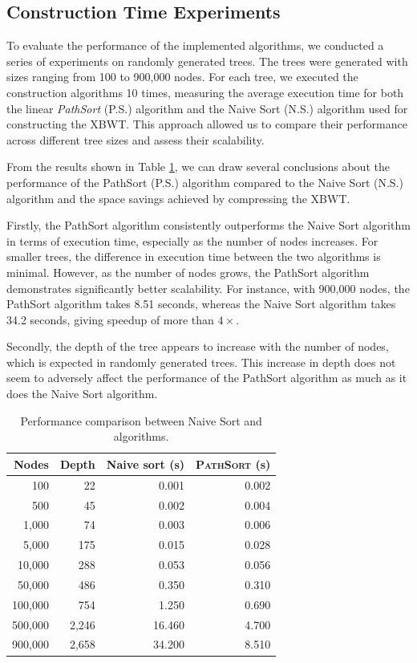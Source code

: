 \subsection{Construction Time Experiments} 

To evaluate the performance of the implemented algorithms, we conducted a series of experiments on randomly generated trees. The trees were generated with sizes ranging from 100 to 900,000 nodes. For each tree, we executed the construction algorithms 10 times, measuring the average execution time for both the linear \emph{PathSort} (P.S.) algorithm and the Naive Sort (N.S.) algorithm used for constructing the XBWT.
This approach allowed us to compare their performance across different tree sizes and assess their scalability.

From the results shown in Table \cref{tab:experiments}, we can draw several conclusions about the performance of the PathSort (P.S.) algorithm compared to the Naive Sort (N.S.) algorithm and the space savings achieved by compressing the XBWT.

Firstly, the PathSort algorithm consistently outperforms the Naive Sort algorithm in terms of execution time, especially as the number of nodes increases. For smaller trees, the difference in execution time between the two algorithms is minimal. However, as the number of nodes grows, the PathSort algorithm demonstrates significantly better scalability. For instance, with 900,000 nodes, the PathSort algorithm takes 8.51 seconds, whereas the Naive Sort algorithm takes 34.2 seconds, giving speedup of more than $4\times$.

Secondly, the depth of the tree appears to increase with the number of nodes, which is expected in randomly generated trees. This increase in depth does not seem to adversely affect the performance of the PathSort algorithm as much as it does the Naive Sort algorithm.

\begin{table}[h]
    \centering
    \begin{tabular}{|r|r||r|r|}
        \hline
        \textbf{Nodes} & \textbf{Depth} & \textbf{Naive sort} (s) & \textbf{\textsc{PathSort} (s)} \\
        \hline
            100 &    22 &  0.001 & 0.002 \\
            500 &    45 &  0.002 & 0.004 \\
          1,000 &    74 &  0.003 & 0.006 \\
          5,000 &   175 &  0.015 & 0.028 \\
         10,000 &   288 &  0.053 & 0.056 \\
         50,000 &   486 &  0.350 & 0.310 \\
        100,000 &   754 &  1.250 & 0.690 \\
        500,000 & 2,246 & 16.460 & 4.700 \\
        900,000 & 2,658 & 34.200 & 8.510 \\
        \hline
    \end{tabular}
    \caption{Performance comparison between Naive Sort and {\pathsort} algorithms.}
    \label{tab:experiments}
\end{table}

